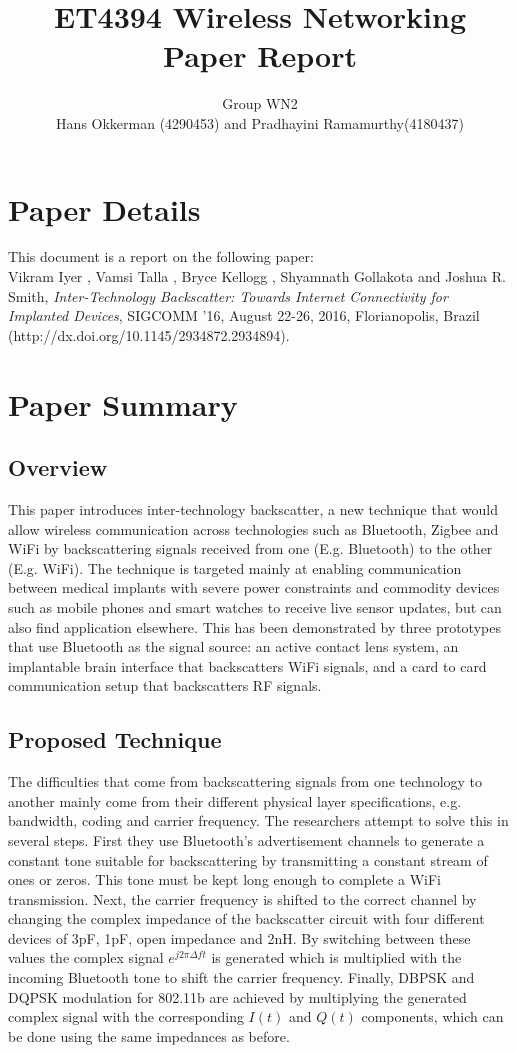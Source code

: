 \documentclass[a4paper]{article}
\title{ET4394 Wireless Networking
\\Paper Report}
\author{Group WN2
\\Hans Okkerman (4290453) and Pradhayini Ramamurthy(4180437)}
\begin{document}
\maketitle

\section{Paper Details}
This document is a report on the following paper:
\\ Vikram Iyer , Vamsi Talla , Bryce Kellogg , Shyamnath Gollakota and Joshua R. Smith, \textit{Inter-Technology Backscatter: Towards Internet Connectivity for Implanted Devices}, SIGCOMM ’16, August 22-26, 2016, Florianopolis, Brazil (http://dx.doi.org/10.1145/2934872.2934894).

\section{Paper Summary}
\subsection{Overview}
This paper introduces inter-technology backscatter, a new technique that would allow wireless communication across technologies such as Bluetooth, Zigbee and WiFi by backscattering signals received from one (E.g. Bluetooth) to the other (E.g. WiFi). The technique is targeted mainly at enabling communication between medical implants with severe power constraints and commodity devices such as mobile phones and smart watches to receive live sensor updates, but can also find application elsewhere. This has been demonstrated by three prototypes that use Bluetooth as the signal source: an active contact lens system, an implantable brain interface that backscatters WiFi signals, and a card to card communication setup that backscatters RF signals. 

\subsection{Proposed Technique}
The difficulties that come from backscattering signals from one technology to another mainly come from their different physical layer specifications, e.g. bandwidth, coding and carrier frequency. The researchers attempt to solve this in several steps. First they use Bluetooth's advertisement channels to generate a constant tone suitable for backscattering by transmitting a constant stream of ones or zeros. This tone must be kept long enough to complete a WiFi transmission. Next, the carrier frequency is shifted to the correct channel by changing the complex impedance of the backscatter circuit with four different devices of 3pF, 1pF, open impedance and 2nH. By switching between these values the complex signal $e^{j2 \pi \Delta ft}$ is generated which is multiplied with the incoming Bluetooth tone to shift the carrier frequency. Finally, DBPSK and DQPSK modulation for 802.11b are achieved by multiplying the generated complex signal with the corresponding $I(t)$ and $Q(t)$ components, which can be done using the same impedances as before. 
\end{document}
